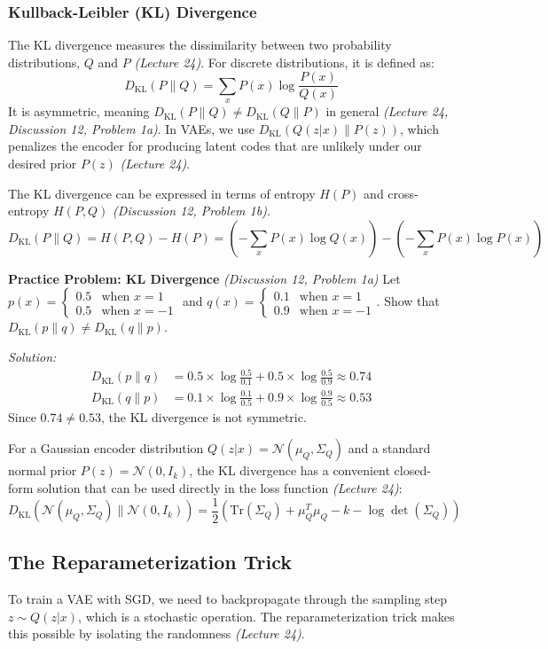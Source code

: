 \documentclass[11pt]{article}
\newcommand{\KL}{\text{KL}}
\newcommand{\Tr}{\text{Tr}}
\begin{document}
\subsubsection{Kullback-Leibler (KL) Divergence}
The KL divergence measures the dissimilarity between two probability distributions, $Q$ and $P$ \textit{(Lecture 24)}. For discrete distributions, it is defined as:
\[ D_{\KL}(P\|Q) = \sum_x P(x) \log \frac{P(x)}{Q(x)} \]
It is asymmetric, meaning $D_{\KL}(P\|Q) \neq D_{\KL}(Q\|P)$ in general \textit{(Lecture 24, Discussion 12, Problem 1a)}. In VAEs, we use $D_{\KL}(Q(z|x) \| P(z))$, which penalizes the encoder for producing latent codes that are unlikely under our desired prior $P(z)$ \textit{(Lecture 24)}.

The KL divergence can be expressed in terms of entropy $H(P)$ and cross-entropy $H(P,Q)$ \textit{(Discussion 12, Problem 1b)}.
\[ D_{\KL}(P\|Q) = H(P,Q) - H(P) = \left( -\sum_x P(x) \log Q(x) \right) - \left( -\sum_x P(x) \log P(x) \right) \]

\textbf{Practice Problem: KL Divergence} \textit{(Discussion 12, Problem 1a)}
Let $p(x) = \begin{cases} 0.5 & \text{when } x=1 \\ 0.5 & \text{when } x=-1 \end{cases}$ and $q(x) = \begin{cases} 0.1 & \text{when } x=1 \\ 0.9 & \text{when } x=-1 \end{cases}$. Show that $D_{\KL}(p\|q) \neq D_{\KL}(q\|p)$.

\textit{Solution:}
\begin{align*}
    D_{\KL}(p\|q) &= 0.5 \times \log \frac{0.5}{0.1} + 0.5 \times \log \frac{0.5}{0.9} \approx 0.74 \\
    D_{\KL}(q\|p) &= 0.1 \times \log \frac{0.1}{0.5} + 0.9 \times \log \frac{0.9}{0.5} \approx 0.53
\end{align*}
Since $0.74 \neq 0.53$, the KL divergence is not symmetric.

For a Gaussian encoder distribution $Q(z|x) = \mathcal{N}(\mu_Q, \Sigma_Q)$ and a standard normal prior $P(z) = \mathcal{N}(0, I_k)$, the KL divergence has a convenient closed-form solution that can be used directly in the loss function \textit{(Lecture 24)}:
\[ D_{\KL}(\mathcal{N}(\mu_Q, \Sigma_Q) \| \mathcal{N}(0, I_k)) = \frac{1}{2} \left( \Tr(\Sigma_Q) + \mu_Q^T \mu_Q - k - \log \det(\Sigma_Q) \right) \]

\subsection{The Reparameterization Trick}
To train a VAE with SGD, we need to backpropagate through the sampling step $z \sim Q(z|x)$, which is a stochastic operation. The reparameterization trick makes this possible by isolating the randomness \textit{(Lecture 24)}.
\end{document}
